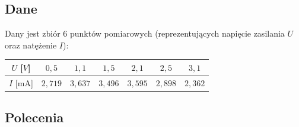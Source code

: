 \documentclass[a4paper,11pt]{article}
\begin{document}
\subsection*{Dane}

Dany jest zbiór 6 punktów pomiarowych (reprezentujących napięcie zasilania $U$ oraz natężenie $I$):

\begin{center}
\begin{tabular}{c|cccccc}
  \toprule
  $U$ [$V$] & $0{,}5$ & $1{,}1$ & $1{,}5$ & $2{,}1$ & $2{,}5$ & $3{,}1$ \\
  \midrule
  $I$ [$\text{mA}$] & $2{,}719$ & $3{,}637$ & $3{,}496$ & $3{,}595$ & $2{,}898$ & $2{,}362$ \\
  \bottomrule
\end{tabular}
\end{center}

\subsection*{Polecenia}
\end{document}
